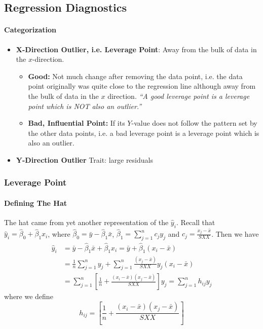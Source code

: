 \documentclass[11pt]{article}
\begin{document}
\subsection{Regression Diagnostics}
\paragraph{Categorization}
\begin{itemize}
    \item \textbf{X-Direction Outlier, i.e. Leverage Point}: Away from the bulk of data in the $x$-direction. 
    \begin{itemize}
        \item \textbf{Good:} Not much change after removing the data point, i.e. the data point originally was quite close to the regression line although away from the bulk of data in the $x$ direction. \textit{``A good leverage point is a leverage point which is NOT also an outlier.''}
        \item \textbf{Bad, Influential Point:} If its $Y$-value does not follow the pattern set by the other data points, i.e. a bad leverage point is a leverage point which is also an outlier. 
    \end{itemize}
    \item \textbf{Y-Direction Outlier} Trait: large residuals
\end{itemize}

\subsubsection{Leverage Point}
\paragraph{Defining The Hat}
The hat came from yet another representation of the $\hat{y}_i$. Recall that $\hat{y}_{i}=\hat{\beta}_{0}+\hat{\beta}_{1} x_{i}$, where $\hat{\beta}_{0}=\bar{y}-\hat{\beta}_{1} \bar{x}$, $\hat{\beta}_{1}=\sum_{j=1}^{n} c_{j} y_{j}$ and $c_{j}=\frac{x_{j}-\bar{x}}{S X X}$.
Then we have
\begin{align*}
    \hat{y}_{i}	
    &=\bar{y}-\hat{\beta}_{1} \bar{x}+\hat{\beta}_{1} x_{i} 
    =\bar{y}+\hat{\beta}_{1}\left(x_{i}-\bar{x}\right) \\
    &=\frac{1}{n} \sum_{j=1}^{n} y_{j}+\sum_{j=1}^{n} \frac{\left(x_{j}-\bar{x}\right)}{S X X} y_{j}\left(x_{i}-\bar{x}\right) \\
    &=\sum_{j=1}^{n}\left[\frac{1}{n}+\frac{\left(x_{i}-\bar{x}\right)\left(x_{j}-\bar{x}\right)}{S X X}\right] y_{j} 
    =\sum_{j=1}^{n} h_{i j} y_{j}
\end{align*}
where we define
\begin{equation*}
    h_{i j}=\left[\frac{1}{n}+\frac{\left(x_{i}-\bar{x}\right)\left(x_{j}-\bar{x}\right)}{S X X}\right]
\end{equation*}
\end{document}
